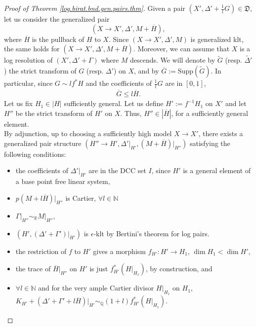 \documentclass{amsart}[12pt,a4paper]
\theoremstyle{definition}
\newcommand{\supp}{\mathrm{Supp}}
\begin{document}
\begin{proof}[Proof of Theorem \ref{log.birat.bnd.gen.pairs.thm}]
Given a pair $(X',\Delta' + \frac 1 l G) \in \mathfrak{D}$, let us consider the generalized pair
\[
(X \to X', \Delta', M + \overline{H}),
\]
where $\overline{H}$ is the pullback of $H$ to $X$.
Since $(X \to X', \Delta', M)$ is generalized klt, the same holds for $(X \to X', \Delta', M + \overline{H})$. 
Moreover, we can assume that $X$ is a log resolution of $(X', \Delta' + \Gamma)$ where $M$ descends.
We will denote by $\widetilde G$ (resp. $\widetilde{\Delta'}$) the strict transform of $G$ (resp. $\Delta'$) on $X$, and by $\overline{G}:= \supp(\widetilde G)$.
In particular, since $G \sim l f^\ast H$ and the coefficients of $\frac 1 l G$ are in $[0, 1]$,
\begin{align}
\label{g.ineq}
\overline{G} \leq l\overline{H}.
\end{align}
\noindent
Let us fix  $H_1 \in |H|$ sufficiently general.
Let us define $H':=f^{-1} H_1$ on $X'$ and let $H''$ be the strict transform of $H'$ on $X$.
Thus, $H'' \in |\overline{H}|$, for a sufficiently general element. 
\\
By adjunction, up to choosing a sufficiently high model $X \to X'$, there exists a generalized pair structure $(H'' \to H',\Delta'\vert_{H'}, (M+\overline{H})\vert_{H''})$ satisfying the following conditions:
\begin{itemize}
\item[(i)] the coefficients of $\Delta'\vert_{H'}$ are in the DCC set $I$, since $H'$ is a general element of a base point free linear system,
\item[(ii)] $p(M +l\overline{H})\vert_{H''}$ is Cartier, $\forall l \in \mathbb{N}$
\item[(iii)] $\Gamma\vert_{H''} \sim_{\mathbb{R}} M\vert_{H''}$,
\item[(iv)] $(H', (\Delta'+\Gamma')\vert_{H'})$ is $\epsilon$-klt by  Bertini's theorem for log pairs.
\item[(v)] the restriction of $f$ to $H'$ gives a morphism $f_{H'}\colon H' \to H_1$, $\dim H_1 < \dim H'$,
\item[(vi)] the trace of $\overline{H}\vert
_{H''}$ on $H'$ is just $f_{H'}^\ast (H\vert_{H_1})$, by construction, and
\item[(vii)] $\forall l \in \mathbb{N}$ and  for the very ample Cartier divisor $H\vert_{H_1}$ on $H_1$, $K_{H'}+(\Delta'+\Gamma'+ l\overline{H})\vert_{H'} \sim_\mathbb{Q} (1+l)f^\ast_{H'} (H\vert_{H_1})$.
\end{itemize}

\end{proof}
\end{document}
